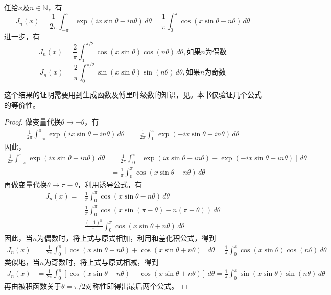\begin{proposition}[贝塞尔积分公式]
    任给$x$及$n\in\mathbb{N}$，有
    \[J_n(x)=\frac{1}{2\pi}\int_{-\pi}^{\pi}\exp(ix\sin\theta - in\theta)\,d\theta=\frac{1}{\pi}\int_{0}^{\pi}\cos(x\sin\theta - n\theta)\,d\theta\]
    进一步，有
    \[J_n(x)=\frac{2}{\pi}\int_{0}^{\pi/2}\cos(x\sin\theta)\cos(n\theta)\,d\theta,\text{如果}n\text{为偶数}\]
    \[J_n(x)=\frac{2}{\pi}\int_{0}^{\pi/2}\sin(x\sin\theta)\sin(n\theta)\,d\theta,\text{如果}n\text{为奇数}\]
\end{proposition}
这个结果的证明需要用到生成函数及傅里叶级数的知识，见\cite{folland}。本书仅验证几个公式的等价性。
\begin{proof}
    做变量代换$\theta\to -\theta$，有
    \begin{align*}
        \frac{1}{2\pi}\int_{-\pi}^{0}\exp(ix\sin\theta - in\theta)\,d\theta&=\frac{1}{2\pi}\int_{0}^{\pi}\exp(-ix\sin\theta + in\theta)\,d\theta
    \end{align*}
    因此，
    \begin{align*}
        \frac{1}{2\pi}\int_{-\pi}^{\pi}\exp(ix\sin\theta - in\theta)\,d\theta&=\frac{1}{2\pi}\int_{0}^{\pi}[\exp(ix\sin\theta - in\theta)+\exp(-ix\sin\theta + in\theta)]\,d\theta\\
                                                                                     &=\frac{1}{\pi}\int_{0}^{\pi}\cos(x\sin\theta - n\theta)\,d\theta
    \end{align*}
    再做变量代换$\theta\to \pi-\theta$，利用诱导公式，有
    \begin{align*}
        J_n(x)=&\frac{1}{\pi}\int_{0}^{\pi}\cos(x\sin\theta - n\theta)\,d\theta\\
        =&\frac{1}{\pi}\int_{0}^{\pi}\cos(x\sin(\pi-\theta) - n(\pi-\theta))\,d\theta\\
        =&\frac{(-1)^n}{\pi}\int_{0}^{\pi}\cos(x\sin\theta + n\theta)\,d\theta
    \end{align*}
    因此，当$n$为偶数时，将上式与原式相加，利用和差化积公式，得到
    \begin{align*}
        J_n(x)&=\frac{1}{2\pi}\int_{0}^{\pi}[\cos(x\sin\theta - n\theta)+\cos(x\sin\theta + n\theta)]\,d\theta=\frac{1}{\pi}\int_{0}^{\pi}\cos(x\sin\theta)\cos(n\theta)\,d\theta
    \end{align*}
    类似地，当$n$为奇数时，将上式与原式相减，得到
    \begin{align*}
        J_n(x)&=\frac{1}{2\pi}\int_{0}^{\pi}[\cos(x\sin\theta - n\theta)-\cos(x\sin\theta + n\theta)]\,d\theta=\frac{1}{\pi}\int_{0}^{\pi}\sin(x\sin\theta)\sin(n\theta)\,d\theta
    \end{align*}
    再由被积函数关于$\theta=\pi/2$对称性即得出最后两个公式。
\end{proof}